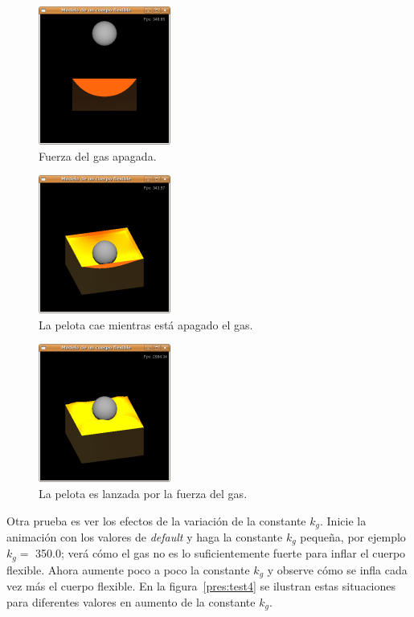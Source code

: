 \begin{figure}
 \centering
 \includegraphics[]{Img/modPres1}
 \caption[Ejecución con la fuerza del gas apagada]{Fuerza del gas apagada.}
 \label{pres:test1}
\end{figure}

\begin{figure}
 \centering
 \includegraphics[]{Img/modPres2}
 \caption[Ejecución con la esfera cayendo en ausencia de fuerza del gas]{La pelota cae mientras está apagado el gas.}
 \label{pres:test2}
\end{figure}

\begin{figure}
 \centering
 \includegraphics[]{Img/modPres3}
 \caption[Ejecución con la esfera lanzada por la fuerza del gas]{La pelota es lanzada por la fuerza del gas.}
 \label{pres:test3}
\end{figure}

Otra prueba es ver los efectos de la variación de la constante $k_g$.
Inicie la animación con los valores de \emph{\foreignlanguage{english}{default}} y haga la constante $k_g$ pequeña, por ejemplo $k_g =$ 350.0; verá cómo el gas no es lo suficientemente fuerte para inflar el cuerpo flexible.
Ahora aumente poco a poco la constante $k_g$ y observe cómo se infla cada vez más el cuerpo flexible.
En la figura~\ref{pres:test4} se ilustran estas situaciones para diferentes valores en aumento de la constante $k_g$.

